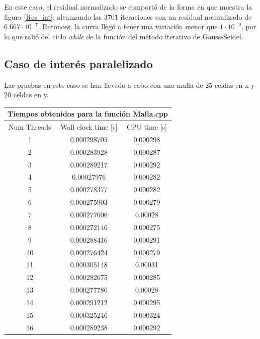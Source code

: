 \documentclass[article,latterpaper]{article}
\begin{document}
En este caso, el residual normalizado se comportó de la forma en que muestra la figura \ref{Res_int}, alcanzando las $3701$ iteraciones con un residual normalizado de $6.667\cdot 10^{-7}$. Entonces, la curva llegó a tener una variación menor que $1\cdot 10^{-9}$, por lo que salió del ciclo \textit{while} de la función del método iterativo de Gauss-Seidel.

\subsection{Caso de interés paralelizado}

Las pruebas en este caso se han llevado a cabo con una malla de $25$ celdas en x y $20$ celdas en y.

\begin{center}
  \begin{tabular}{|c|c|c|}
    \hline
    \multicolumn{3}{|c|}{Tiempos obtenidos para la función Malla.cpp} \\
    \hline
    Num Threads & Wall clock time [s] & CPU time [s] \\
    \hline
    1 & 0.000298705 & 0.000298 \\
    \hline
    2 & 0.000283928 & 0.000287 \\
    \hline
    3 & 0.000289217 & 0.000292 \\
    \hline
    4 & 0.00027976 & 0.000282 \\
    \hline
    5 & 0.000278377 & 0.000282 \\
    \hline
    6 & 0.000275903 & 0.000279 \\
    \hline
    7 & 0.000277606 & 0.00028 \\
    \hline
    8 & 0.000272146 & 0.000275 \\
    \hline
    9 & 0.000288416 & 0.000291 \\
    \hline
    10 & 0.000276424 & 0.000279 \\
    \hline
    11 & 0.000305148 & 0.00031 \\
    \hline
    12 & 0.000282675 & 0.000285 \\
    \hline
    13 & 0.000277786 & 0.00028 \\
    \hline
    14 & 0.000291212 & 0.000295 \\
    \hline
    15 & 0.000325246 & 0.000324 \\
    \hline
    16 & 0.000289238 & 0.000292 \\
    \hline
  \end{tabular}
\end{center}
\end{document}
